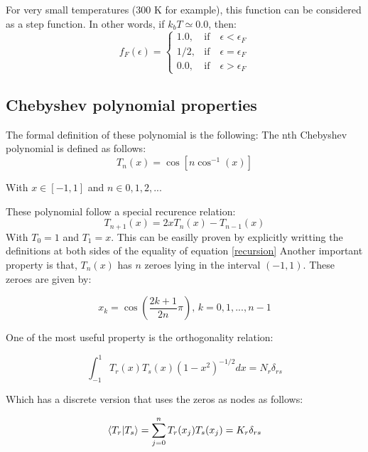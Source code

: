 For very small temperatures (300 K for example), this function can be considered as a step function. In other words, if $k_bT \simeq 0.0$, then:
%
\begin{equation}
  f_F(\epsilon) = \left\{\begin{array}{clrr}
    1.0, & \mathrm{if} \quad  \epsilon < \epsilon_F \\
    1/2, &  \mathrm{if}  \quad  \epsilon = \epsilon_F \\
    0.0, &  \mathrm{if}  \quad  \epsilon >\epsilon_F
  \end{array}\right.
  \label{adj}
\end{equation}

\subsection{Chebyshev polynomial properties}

The formal definition of these polynomial is the following: The nth Chebyshev polynomial is defined as follows: 
%
\begin{equation}
  T_n(x)= \cos\left[n \cos^{-1}(x) \right]
  \label{nthcheb}
\end{equation}

With $x \in [-1,1]$ and $n \in 0,1,2, ...$

These polynomial follow a special recurence relation: 
%
\begin{equation}
  T_{n+1}(x)= 2xT_{n}(x) - T_{n-1}(x)
  \label{recursion}
\end{equation}
%
With $T_0 = 1$ and $T_1 = x$.
This can be easilly proven by explicitly writting the definitions at both sides of the equality of equation \ref{recursion} 
Another important property is that, $T_n(x)$ has $n$ zeroes lying in the interval $(-1,1)$. These zeroes are given by: 

\begin{equation}
  x_k = \cos\left(\frac{2k+1}{2n}\pi\right), \, k=0,1,...,n-1
  \label{zeroes}
\end{equation}


One of the most useful property is the orthogonality relation:

\begin{equation}
  \int_{-1}^{1}{ T_r(x) T_s(x) (1-x^2)^{-1/2}} dx = N_r\delta_{rs} 
  \label{zeroes}
\end{equation}

Which has a discrete version that uses the zeros as nodes as follows:

\begin{equation}
  \langle T_r | T_s \rangle =  \sum_{j=0}^{n}{T_r(x_j) T_s(x_j)}= K_r\delta_{rs} 
  \label{zeroes}
\end{equation}

